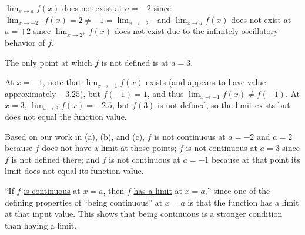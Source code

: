 \begin{activitySolution}
\ba
	\item $\lim_{x \to a} f(x)$ does not exist at $a = -2$ since $\lim_{x \to -2^-} f(x) = 2 \ne -1 = \lim_{x \to -2^+}$ and $\lim_{x \to a} f(x)$ does not exist at $a = +2$ since $\lim_{x \to 2^+} f(x)$ does not exist due to the infinitely oscillatory behavior of $f$.
	\item The only point at which $f$ is not defined is at $a = 3$.
	\item At $x = -1$, note that $\lim_{x \to -1} f(x)$ exists (and appears to have value approximately $-3.25$), but $f(-1) = 1$, and thus $\lim_{x \to -1} f(x) \ne f(-1)$.  At $x = 3$, $\lim_{x \to 3} f(x) = -2.5$, but $f(3)$ is not defined, so the limit exists but does not equal the function value.
	\item Based on our work in (a), (b), and (c), $f$ is not continuous at $a=-2$ and $a = 2$ because $f$ does not have a limit at those points; $f$ is not continuous at $a = 3$ since $f$ is not defined there; and $f$ is not continuous at $a = -1$ because at that point its limit does not equal its function value.
	\item ``If $f$ \underline{is continuous} at $x = a$, then $f$ \underline{has a limit} at $x = a$,'' since one of the defining properties of ``being continuous'' at $x = a$ is that the function has a limit at that input value.  This shows that being continuous is a stronger condition than having a limit.
\ea
\end{activitySolution}
\aftera